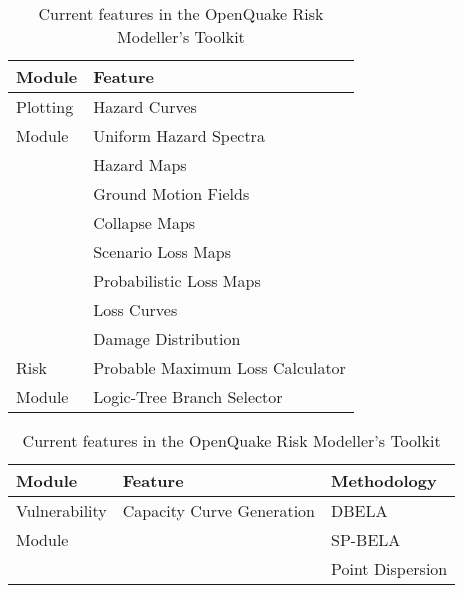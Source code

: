 \begin{table}[!htbp]
\centering
\begin{tabular}{|l|l|} \hline
\textbf{Module} & \textbf{Feature} \\ \hline
Plotting & Hazard Curves \\
Module   & Uniform Hazard Spectra \\
         & Hazard Maps \\
         & Ground Motion Fields \\
         & Collapse Maps \\
         & Scenario Loss Maps \\
         & Probabilistic Loss Maps \\
         & Loss Curves \\
         & Damage Distribution \\ \hline
Risk     & Probable Maximum Loss Calculator \\
Module   & Logic-Tree Branch Selector \\ \hline
\end{tabular}

\begin{tabular}{|l|l|l|} \hline
\textbf{Module} & \textbf{Feature} & \textbf{Methodology} \\ \hline
Vulnerability   & Capacity Curve Generation & DBELA \\
Module          & & SP-BELA \\
                & & Point Dispersion \\ \hline

\end{tabular}
\caption{Current features in the OpenQuake Risk Modeller's Toolkit}
\label{tab:current_features}

\end{table}
